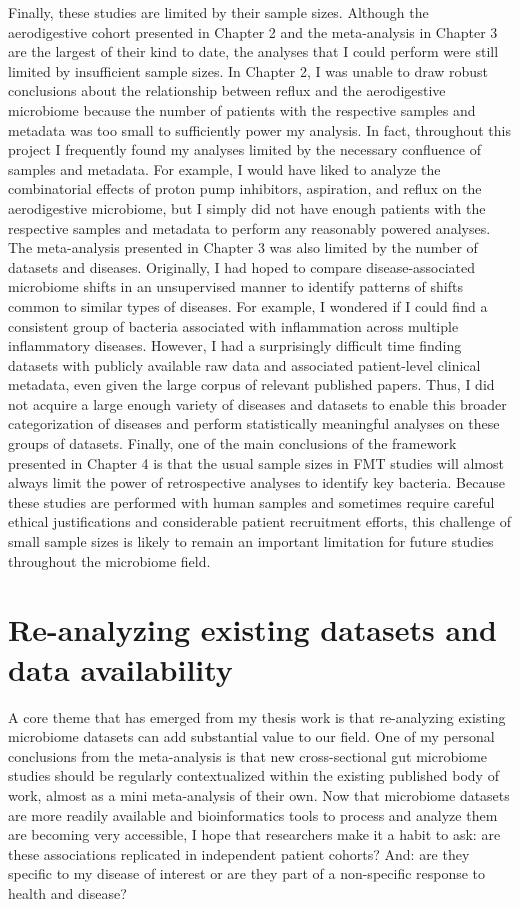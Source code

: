 Finally, these studies are limited by their sample sizes.
Although the aerodigestive cohort presented in Chapter 2 and the meta-analysis in Chapter 3 are the largest of their kind to date, the analyses that I could perform were still limited by insufficient sample sizes.
In Chapter 2, I was unable to draw robust conclusions about the relationship between reflux and the aerodigestive microbiome because the number of patients with the respective samples and metadata was too small to sufficiently power my analysis.
In fact, throughout this project I frequently found my analyses limited by the necessary confluence of samples and metadata.
For example, I would have liked to analyze the combinatorial effects of proton pump inhibitors, aspiration, and reflux on the aerodigestive microbiome, but I simply did not have enough patients with the respective samples and metadata to perform any reasonably powered analyses.
The meta-analysis presented in Chapter 3 was also limited by the number of datasets and diseases.
Originally, I had hoped to compare disease-associated microbiome shifts in an unsupervised manner to identify patterns of shifts common to similar types of diseases.
For example, I wondered if I could find a consistent group of bacteria associated with inflammation across multiple inflammatory diseases.
However, I had a surprisingly difficult time finding datasets with publicly available raw data and associated patient-level clinical metadata, even given the large corpus of relevant published papers.
Thus, I did not acquire a large enough variety of diseases and datasets to enable this broader categorization of diseases and perform statistically meaningful analyses on these groups of datasets.
Finally, one of the main conclusions of the framework presented in Chapter 4 is that the usual sample sizes in FMT studies will almost always limit the power of retrospective analyses to identify key bacteria.
Because these studies are performed with human samples and sometimes require careful ethical justifications and considerable patient recruitment efforts, this challenge of small sample sizes is likely to remain an important limitation for future studies throughout the microbiome field.

\section{Re-analyzing existing datasets and data availability}

A core theme that has emerged from my thesis work is that re-analyzing existing microbiome datasets can add substantial value to our field.
One of my personal conclusions from the meta-analysis is that new cross-sectional gut microbiome studies should be regularly contextualized within the existing published body of work, almost as a mini meta-analysis of their own.
Now that microbiome datasets are more readily available and bioinformatics tools to process and analyze them are becoming very accessible, I hope that researchers make it a habit to ask: are these associations replicated in independent patient cohorts? And: are they specific to my disease of interest or are they part of a non-specific response to health and disease?

